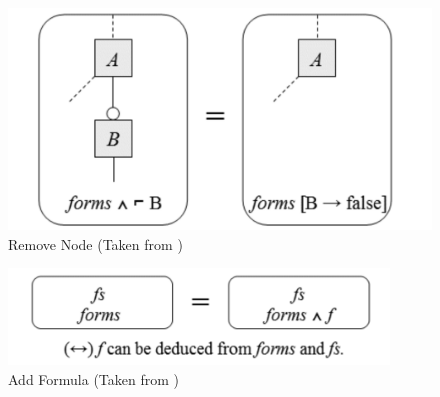 \documentclass[12pt]{article}
\begin{document}
\begin{figure}[H]
\centering
\includegraphics[width=1\textwidth, frame]{images/RemoveNode}
\caption{Remove Node (Taken from \cite{jucs})}
\end{figure}

\begin{figure}[H]
\centering
\includegraphics[width=0.9\textwidth, frame]{images/AddFormula}
\caption{Add Formula (Taken from \cite{jucs})}
\end{figure}

\pagebreak


\end{document}
